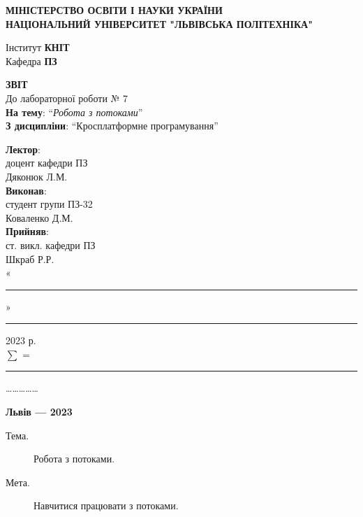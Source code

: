 \documentclass[14pt]{extreport}
\newcommand\subject{Кросплатформне програмування}
\newcommand\lecturer{доцент кафедри ПЗ\\Дяконюк Л.М.}
\newcommand\teacher{ст. викл. кафедри ПЗ\\Шкраб Р.Р.}
\newcommand\mygroup{ПЗ-32}
\newcommand\lab{7}
\newcommand\theme{Робота з потоками}
\newcommand\purpose{Навчитися працювати з потоками}
\begin{document}
\begin{normalsize}
	\begin{titlepage}
		\thispagestyle{empty}
		\begin{center}
			\textbf{МІНІСТЕРСТВО ОСВІТИ І НАУКИ УКРАЇНИ\\
				НАЦІОНАЛЬНИЙ УНІВЕРСИТЕТ "ЛЬВІВСЬКА ПОЛІТЕХНІКА"}
		\end{center}
		\begin{flushright}
			Інститут \textbf{КНІТ}\\
			Кафедра \textbf{ПЗ}
		\end{flushright}
		\vspace{160pt}
		\begin{center}
			\textbf{ЗВІТ}\\
			\vspace{10pt}
			До лабораторної роботи № \lab\\
			\textbf{На тему}: “\textit{\theme}”\\
			\textbf{З дисципліни}: “\subject”
		\end{center}
		\vspace{40pt}
		\begin{flushright}
			
			\textbf{Лектор}:\\
			\lecturer\\
			\vspace{10pt}
			\textbf{Виконав}:\\
			
			студент групи \mygroup\\
			Коваленко Д.М.\\
			\vspace{10pt}
			\textbf{Прийняв}:\\
			
			\teacher\\
			
			\vspace{28pt}
			«\rule{1cm}{0.15mm}» \rule{1.5cm}{0.15mm} 2023 р.\\
			$\sum$ = \rule{1cm}{0.15mm}……………\\
			
		\end{flushright}
		\vspace{\fill}
		\begin{center}
			\textbf{Львів — 2023}
		\end{center}
	\end{titlepage}
		
	\begin{description}
		\item[Тема.] \theme.
		\item[Мета.] \purpose.
	\end{description}
	


\end{normalsize}
\end{document}

